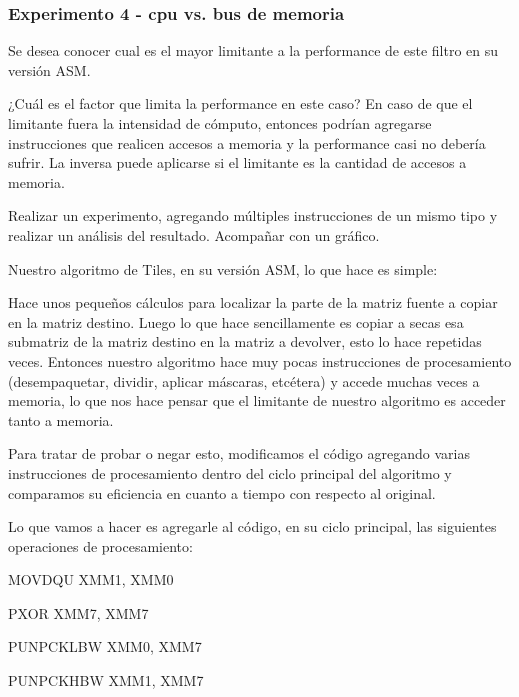\vspace*{0.3cm} \noindent
\subsubsection{Experimento 4 - cpu vs. bus de memoria}

	Se desea conocer cual es el mayor limitante a la performance de este filtro en su versión ASM.

	¿Cuál es el factor que limita la performance en este caso? En caso de que el limitante
	fuera la intensidad de cómputo, entonces podrían agregarse instrucciones que realicen
	accesos a memoria y la performance casi no debería sufrir. La inversa puede aplicarse
	si el limitante es la cantidad de accesos a memoria.
	
	Realizar un experimento, agregando múltiples instrucciones de un mismo tipo y realizar un análisis
	del resultado. Acompañar con un gráfico.
\vspace*{0.3cm} \noindent

Nuestro algoritmo de Tiles, en su versión ASM, lo que hace es simple:\vspace*{0.3cm} \noindent

Hace unos pequeños cálculos para localizar la parte de la matriz fuente a copiar en la 
matriz destino. Luego lo que hace sencillamente es copiar a secas esa submatriz de la 
matriz destino en la matriz a devolver, esto lo hace repetidas veces. 
Entonces nuestro algoritmo hace muy pocas instrucciones de procesamiento (desempaquetar, 
dividir, aplicar máscaras, etcétera) y accede muchas veces a memoria, lo que nos hace pensar 
que el limitante de nuestro algoritmo es acceder tanto a memoria.\vspace*{0.3cm} \noindent

Para tratar de probar o negar esto, modificamos el código agregando varias instrucciones de 
procesamiento dentro del ciclo principal del algoritmo y comparamos su eficiencia en cuanto a 
tiempo con respecto al original.\vspace*{0.3cm} \noindent

Lo que vamos a hacer es agregarle al código, en su ciclo principal, las siguientes operaciones 
de procesamiento:\vspace*{0.3cm} \noindent


MOVDQU XMM1, XMM0

PXOR XMM7, XMM7 

PUNPCKLBW XMM0, XMM7

PUNPCKHBW XMM1, XMM7

